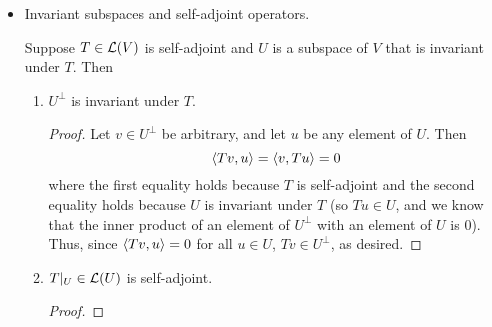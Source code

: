 \documentclass[../main.tex]{subfiles}
\begin{document}
\begin{itemize}
\begin{theorem}
\begin{proof}
\begin{align*}
                0 &= a_0v+a_1Tv+\cdots+a_nT^nv\\
                &= (a_0I+a_1T+\cdots+a_nT^n)v\\
                &= c(T^2+b_1T+c_1I)\cdots(T_2+b_MT+c_MI)(T-\lambda_1I)\cdots(T-\lambda_mI)v
            \end{align*}
            Since $T$ is self-adjoint and $b_j,c_j\in\R$ satisfy $b_j^2<4c_j$ for each $j$, we have by consecutive applications of Theorem \ref{trm:invertibleQuadratics} that each $T^2+b_jT+c_jI$ is invertible. Thus, if we multiply both sides of the above equation by $1/c$ (recall that $c\neq 0$) and $(T^2+b_jT+c_jI)^{-1}$ for each $j$, we obtain
            \begin{equation*}
                0 = (T-\lambda I)\cdots(T-\lambda_mI)v
            \end{equation*}
            Therefore, by an argument symmetric to that used in the last paragraph of the proof of Theorem \ref{trm:eigenExists}, we have that $T$ has an eigenvalue, as desired.
        \end{proof}
    \end{theorem}
    \item Invariant subspaces and self-adjoint operators.
    \begin{theorem}\label{trm:invariantSelfAdjoint}
        Suppose $T\in\mathcal{L}(V)$ is self-adjoint and $U$ is a subspace of $V$ that is invariant under $T$. Then
        \begin{enumerate}[label={\textup{(}\alph*\textup{)}},ref={\thetheorem\alph*}]
            \item \label{trm:invariantSelfAdjointa}$U^\perp$ is invariant under $T$.
            \begin{proof}
                Let $v\in U^\perp$ be arbitrary, and let $u$ be any element of $U$. Then
                \begin{equation*}
                    \left\langle{Tv},{u}\right\rangle = \left\langle{v},{Tu}\right\rangle = 0
                \end{equation*}
                where the first equality holds because $T$ is self-adjoint and the second equality holds because $U$ is invariant under $T$ (so $Tu\in U$, and we know that the inner product of an element of $U^\perp$ with an element of $U$ is 0). Thus, since $\left\langle{Tv},{u}\right\rangle=0$ for all $u\in U$, $Tv\in U^\perp$, as desired.
            \end{proof}
            \item \label{trm:invariantSelfAdjointb}$T|_U\in\mathcal{L}(U)$ is self-adjoint.
            \begin{proof}

\end{proof}
\end{enumerate}
\end{theorem}
\end{itemize}
\end{document}
